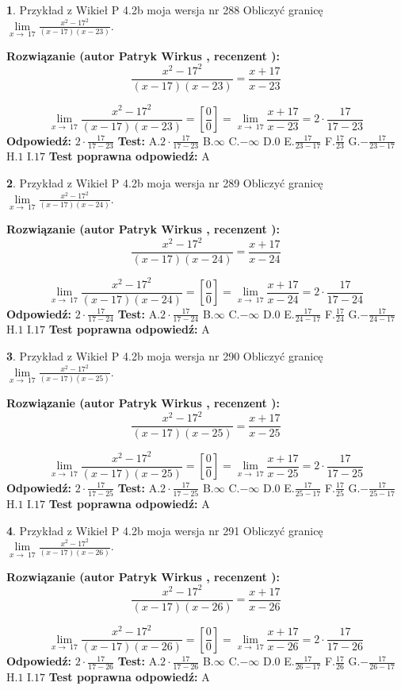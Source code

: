 \documentclass[12pt, a4paper]{article}
\theoremstyle{definition} %
\newtheorem{zad}{}
\newcommand{\zadStart}[1]{\begin{zad}#1\newline}
\newcommand{\zadStop}{\end{zad}}
\newcommand{\rozwStart}[2]{\noindent \textbf{Rozwiązanie (autor #1 , recenzent #2): }\newline}
\newcommand{\rozwStop}{\newline}
\newcommand{\odpStart}{\noindent \textbf{Odpowiedź:}\newline}
\newcommand{\odpStop}{\newline}
\newcommand{\testStart}{\noindent \textbf{Test:}\newline}
\newcommand{\testStop}{\newline}
\newcommand{\kluczStart}{\noindent \textbf{Test poprawna odpowiedź:}\newline}
\newcommand{\kluczStop}{\newline}
\begin{document}
\zadStart{Przykład z Wikieł P 4.2b moja wersja nr 288}
Obliczyć granicę $\lim\limits_{x\to\ 17}\frac{x^{2}-17^{2}}{(x-17)(x-23)}$.
\zadStop
\rozwStart{Patryk Wirkus}{}
$$\frac{x^{2}-17^{2}}{(x-17)(x-23)}=\frac{x+17}{x-23}$$

$$\lim\limits_{x\to\ 17}\frac{x^{2}-17^{2}}{(x-17)(x-23)}=[\frac{0}{0}]=\lim\limits_{x\to\ 17}\frac{x+17}{x-23}=2 \cdot \frac{17}{17-23}$$
\rozwStop
\odpStart
$2 \cdot \frac{17}{17-23}$
\odpStop
\testStart
A.$2 \cdot \frac{17}{17-23}$
B.$\infty$
C.$-\infty$
D.$0$
E.$\frac{17}{23-17}$
F.$\frac{17}{23}$
G.$-\frac{17}{23-17}$
H.$1$
I.$17$
\testStop
\kluczStart
A
\kluczStop



\zadStart{Przykład z Wikieł P 4.2b moja wersja nr 289}
Obliczyć granicę $\lim\limits_{x\to\ 17}\frac{x^{2}-17^{2}}{(x-17)(x-24)}$.
\zadStop
\rozwStart{Patryk Wirkus}{}
$$\frac{x^{2}-17^{2}}{(x-17)(x-24)}=\frac{x+17}{x-24}$$

$$\lim\limits_{x\to\ 17}\frac{x^{2}-17^{2}}{(x-17)(x-24)}=[\frac{0}{0}]=\lim\limits_{x\to\ 17}\frac{x+17}{x-24}=2 \cdot \frac{17}{17-24}$$
\rozwStop
\odpStart
$2 \cdot \frac{17}{17-24}$
\odpStop
\testStart
A.$2 \cdot \frac{17}{17-24}$
B.$\infty$
C.$-\infty$
D.$0$
E.$\frac{17}{24-17}$
F.$\frac{17}{24}$
G.$-\frac{17}{24-17}$
H.$1$
I.$17$
\testStop
\kluczStart
A
\kluczStop



\zadStart{Przykład z Wikieł P 4.2b moja wersja nr 290}
Obliczyć granicę $\lim\limits_{x\to\ 17}\frac{x^{2}-17^{2}}{(x-17)(x-25)}$.
\zadStop
\rozwStart{Patryk Wirkus}{}
$$\frac{x^{2}-17^{2}}{(x-17)(x-25)}=\frac{x+17}{x-25}$$

$$\lim\limits_{x\to\ 17}\frac{x^{2}-17^{2}}{(x-17)(x-25)}=[\frac{0}{0}]=\lim\limits_{x\to\ 17}\frac{x+17}{x-25}=2 \cdot \frac{17}{17-25}$$
\rozwStop
\odpStart
$2 \cdot \frac{17}{17-25}$
\odpStop
\testStart
A.$2 \cdot \frac{17}{17-25}$
B.$\infty$
C.$-\infty$
D.$0$
E.$\frac{17}{25-17}$
F.$\frac{17}{25}$
G.$-\frac{17}{25-17}$
H.$1$
I.$17$
\testStop
\kluczStart
A
\kluczStop



\zadStart{Przykład z Wikieł P 4.2b moja wersja nr 291}
Obliczyć granicę $\lim\limits_{x\to\ 17}\frac{x^{2}-17^{2}}{(x-17)(x-26)}$.
\zadStop
\rozwStart{Patryk Wirkus}{}
$$\frac{x^{2}-17^{2}}{(x-17)(x-26)}=\frac{x+17}{x-26}$$

$$\lim\limits_{x\to\ 17}\frac{x^{2}-17^{2}}{(x-17)(x-26)}=[\frac{0}{0}]=\lim\limits_{x\to\ 17}\frac{x+17}{x-26}=2 \cdot \frac{17}{17-26}$$
\rozwStop
\odpStart
$2 \cdot \frac{17}{17-26}$
\odpStop
\testStart
A.$2 \cdot \frac{17}{17-26}$
B.$\infty$
C.$-\infty$
D.$0$
E.$\frac{17}{26-17}$
F.$\frac{17}{26}$
G.$-\frac{17}{26-17}$
H.$1$
I.$17$
\testStop
\kluczStart
A
\kluczStop
\end{document}

